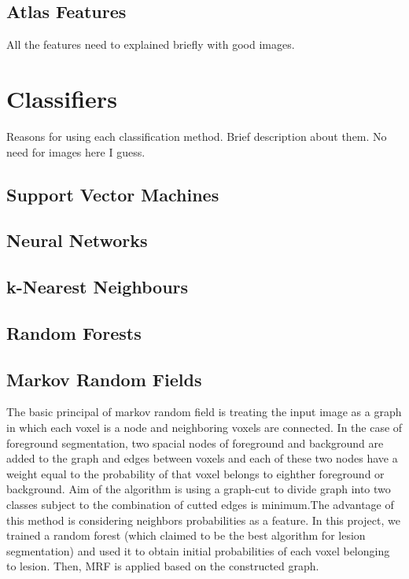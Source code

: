 \documentclass{article} %
\begin{document}
\subsection{Atlas Features}

All the features need to explained briefly with good images.

\section{Classifiers}

Reasons for using each classification method. Brief description about them. No need for images here I guess.  

\subsection{Support Vector Machines}

\subsection{Neural Networks}

\subsection{k-Nearest Neighbours}

\subsection{Random Forests}

\subsection{Markov Random Fields}
The basic principal of markov random field is treating the input image as a graph in which each voxel is a node and neighboring voxels are connected. In the case of foreground segmentation, two spacial nodes of foreground and background are added to the graph and edges between voxels and each of these two nodes have a weight equal to the probability of that voxel belongs to eighther foreground or background. Aim of the algorithm is using a graph-cut to divide graph into two classes subject to the combination of cutted edges is minimum.The advantage of this method is considering neighbors probabilities as a feature.
In this project, we trained a random forest (which claimed to be the best algorithm for lesion segmentation) and used it to obtain initial probabilities of each voxel belonging to lesion. Then, MRF is applied based on the constructed graph.
\end{document}
